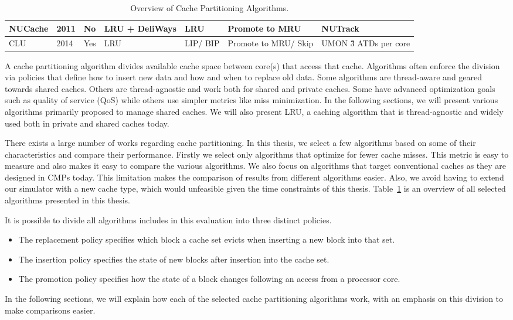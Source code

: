\begin{table}[!htb]
\begin{tabular}{|p{1.0cm}|p{0.5cm}|p{0.8cm}|p{1.2cm}|p{1.2cm}|p{1.2cm}|p{1.2cm}|}
NUCache                         & 2011                           & No                          & LRU + DeliWays     & LRU                            & Promote to MRU                 & NUTrack                               \\ \hline
CLU                             & 2014                           & Yes                         & LRU                              & LIP/ BIP                        & Promote to MRU/ Skip            & UMON \~3 ATDs per core                 \\ \hline
\end{tabular}
\label{tbl:algorithms}
\caption{Overview of Cache Partitioning Algorithms.}
\end{table}

A cache partitioning algorithm divides available cache space between core(s) that access that cache.
Algorithms often enforce the division via policies that define how to insert new data and how and when to replace old data.
Some algorithms are thread-aware and geared towards shared caches.
Others are thread-agnostic and work both for shared and private caches.
Some have advanced optimization goals such as quality of service (QoS) while others use simpler metrics like miss minimization.
In the following sections, we will present various algorithms primarily proposed to manage shared caches.
We will also present LRU, a caching algorithm that is thread-agnostic and widely used both in private and shared caches today.

There exists a large number of works regarding cache partitioning. 
In this thesis, we select a few algorithms based on some of their characteristics and compare their performance.
Firstly we select only algorithms that optimize for fewer cache misses.
This metric is easy to measure and also makes it easy to compare the various algorithms.
We also focus on algorithms that target conventional caches as they are designed in CMPs today.
This limitation makes the comparison of results from different algorithms easier.
Also, we avoid having to extend our simulator with a new cache type, which would unfeasible given the time constraints of this thesis.
Table~\ref{tbl:algorithms} is an overview of all selected algorithms presented in this thesis.

It is possible to divide all algorithms includes in this evaluation into three distinct policies.
\begin{itemize}
\item The replacement policy specifies which block a cache set evicts when inserting a new block into that set.
\item The insertion policy specifies the state of new blocks after insertion into the cache set.
\item The promotion policy specifies how the state of a block changes following an access from a processor core.
\end{itemize}
In the following sections, we will explain how each of the selected cache partitioning algorithms work, with an emphasis on this division to make comparisons easier.











